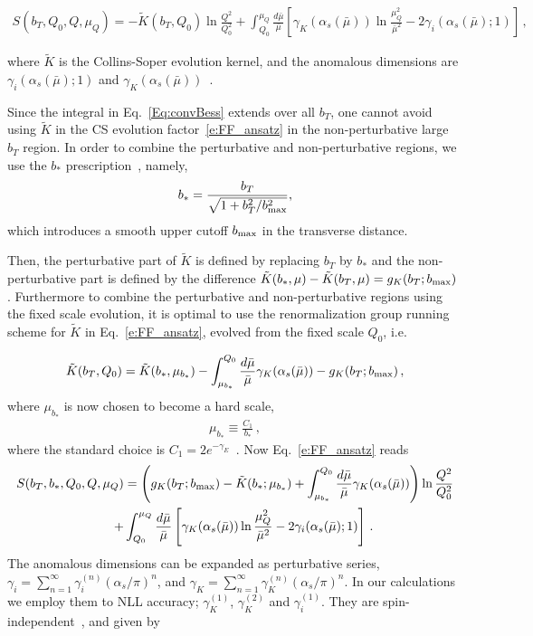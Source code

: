 \documentclass[a4paper]{article}
\newcommand{\bmax}{b_{\rm max}}
\newcommand\bstarsc{b_*}
\newcommand\mubstar{\mu_{\bstarsc}}
\newcommand{\bea}{\begin{eqnarray}}
\newcommand{\eea}{\end{eqnarray}}
\newcommand{\ps}[1]{{\color{magenta}#1}}
\begin{document}
\begin{eqnarray}
S(b_T, Q_0, Q, \mu_Q) =  -\tilde K(b_T,Q_0) \ln\frac{Q^2}{Q_0^2}  +
 \int_{Q_0}^{\mu_Q}\frac{d\bar\mu}{\bar\mu}\left[\gamma_K(\alpha_s(\bar\mu))\ln\frac{\mu_Q^2}{\bar\mu^2}-2 \gamma_i(\alpha_s(\bar\mu);1)\right]\, ,
 \label{e:FF_ansatz}
\end{eqnarray}

\noindent
where $\tilde K$ is the Collins-Soper evolution kernel, and the anomalous dimensions are $\gamma_i(\alpha_s(\bar\mu);1)$ and $\gamma_K(\alpha_s(\bar\mu))$~\cite{Collins:2014jpa}.

Since the integral in Eq.~\eqref{Eq:convBess} extends over all $b_T$,
one cannot avoid using $\tilde K$ in the 
CS evolution factor~\eqref{e:FF_ansatz}  in the non-perturbative large $b_T$ region.
In order to combine the perturbative and non-perturbative regions,
we use the $\bstarsc$ prescription~\cite{Collins:1984kg}, namely,  
 \begin{align}
\label{eq:bstar}
  \bstarsc = \frac{b_T }{\sqrt{ 1 + b_T^2/\bmax^2}},
\end{align}
which introduces a smooth upper cutoff $b_{\rm max}$  in the transverse distance. 


 Then, the perturbative part of 
$\tilde{K}$ is defined by replacing $b_T$ by $\bstarsc$ and the non-perturbative part is defined by the difference  
$\tilde{K}(\bstarsc,\mu)-\tilde{K}(b_T,\mu)=g_K(b_T;\bmax)~$\cite{Collins:2014jpa}.
Furthermore  to combine the perturbative and non-perturbative regions
using the fixed scale evolution, it is optimal  to use the renormalization group running scheme for  $\tilde K$ in Eq.~\eqref{e:FF_ansatz}, evolved from the fixed scale $Q_0$, i.e.

\bea
\tilde K(b_T,Q_0)=\tilde K(\bstarsc,\mubstar) -\int_{\mubstar}^{Q_0}\frac{d\bar\mu}{\bar\mu}\gamma_K(\alpha_s(\bar\mu)) -g_K(b_T;b_{\rm max}) \, ,
\eea
where $\mubstar$ is now chosen to become a hard scale,  
\begin{eqnarray}
\mubstar \equiv \frac{C_1}{b_*}\, ,
\end{eqnarray}
\ps{where the standard choice is $C_1 =2 e^{-\gamma_E}$~\cite{Collins:2017oxh}.} Now  Eq.~\eqref{e:FF_ansatz} reads~\cite{Collins:2014jpa}
\begin{align}
S(b_T,\bstarsc, Q_0, Q, \mu_Q) &=  \left( g_K(b_T;b_{\rm max})- \tilde K(\bstarsc;\mubstar)+
  \int_{\mubstar}^{Q_0}\frac{d\bar\mu}{\bar\mu}\gamma_K(\alpha_s(\bar\mu)) \right)\ln\frac{Q^2}{Q_0^2}  
 \nonumber \\
 + & \int_{Q_0}^{\mu_Q}\frac{d\bar\mu}{\bar\mu}\left[\gamma_K(\alpha_s(\bar\mu))\ln\frac{\mu_Q^2}{\bar\mu^2}-2 \gamma_i(\alpha_s(\bar\mu);1)\right]\, .
 \label{e:final}
\end{align}
The anomalous  dimensions  can be expanded as
perturbative series,  
$\gamma_i =\sum_{n=1}^\infty \gamma_i^{(n)} \left(\alpha_s/\pi\right)^n$, and $\gamma_K =\sum_{n=1}^\infty \gamma_K^{(n)} \left(\alpha_s/\pi\right)^n$.  In our calculations we employ  them to NLL accuracy;
$\gamma_K^{(1)}$, $\gamma_K^{(2)}$ and $\gamma_i^{(1)}$.
They are spin-independent~\cite{Collins:1984kg,Qiu:2000ga,Landry:2002ix,Moch:2005id,Kang:2011mr,Aybat:2011zv,Echevarria:2012pw,Grozin:2014hna,Collins:2014jpa},  and given by
\end{document}
